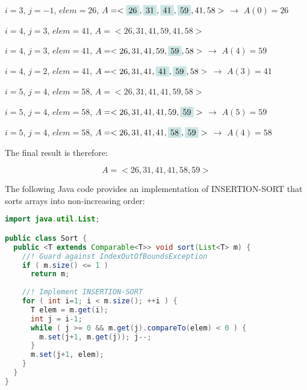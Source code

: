 \documentclass[a4paper,12pt]{article}
\begin{document}
$i=3$, $j=-1$, $elem = 26$, $A = <\colorbox{highlightcolor}{26}, \colorbox{highlightcolor}{31}, \colorbox{highlightcolor}{41}, \colorbox{highlightcolor}{59}, 41, 58>$  $\rightarrow$ $A(0) = 26$

$i=4$, $j=3$, $elem = 41$, $A = <26, 31, 41, 59, 41, 58>$

$i=4$, $j=3$, $elem = 41$, $A = <26, 31, 41, 59, \colorbox{highlightcolor}{59}, 58>$ $\rightarrow$ $A(4) = 59$

$i=4$, $j=2$, $elem = 41$, $A = <26, 31, 41, \colorbox{highlightcolor}{41}, \colorbox{highlightcolor}{59}, 58>$ $\rightarrow$ $A(3) = 41$

$i=5$, $j=4$, $elem = 58$, $A = <26, 31, 41, 41, 59, 58>$

$i=5$, $j=4$, $elem = 58$, $A = <26, 31, 41, 41, 59, \colorbox{highlightcolor}{59}>$ $\rightarrow$ $A(5) = 59$

$i=5$, $j=4$, $elem = 58$, $A = <26, 31, 41, 41, \colorbox{highlightcolor}{58}, \colorbox{highlightcolor}{59}>$ $\rightarrow$ $A(4) = 58$

\newpage
The final result is therefore:

\[ A = <26, 31, 41, 41, 58, 59> \]

\vspace{5mm}

The following Java code provides an implementation of INSERTION-SORT that sorts arrays into non-increasing order:

\begin{lstlisting}[language=Java]
import java.util.List;

public class Sort {
  public <T extends Comparable<T>> void sort(List<T> m) {
    //! Guard against IndexOutOfBoundsException
    if ( m.size() <= 1 ) 
      return m;
      
    //! Implement INSERTION-SORT
    for ( int i=1; i < m.size(); ++i ) {
      T elem = m.get(i);
      int j = i-1;
      while ( j >= 0 && m.get(j).compareTo(elem) < 0 ) {
        m.set(j+1, m.get(j)); j--;
      }
      m.set(j+1, elem);
    }
  }
}
\end{lstlisting}
\end{document}
